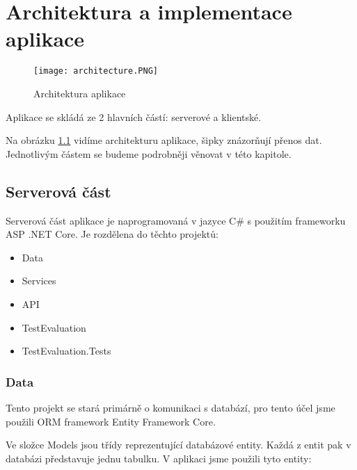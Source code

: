 \chapter{Architektura a implementace aplikace}

\begin{figure}
	\centering
	\texttt{[image: architecture.PNG]}
	\caption{Architektura aplikace}
	\label{fig:Architecture}
\end{figure}

Aplikace se skládá ze 2 hlavních částí: serverové a klientské.

Na obrázku \ref{fig:Architecture} vidíme architekturu aplikace, šipky znázorňují přenos dat. Jednotlivým částem se budeme podrobněji věnovat v této kapitole.

\section{Serverová část}

Serverová část aplikace je naprogramovaná v jazyce C\# s použitím 
frameworku ASP .NET Core. Je rozdělena do těchto projektů:

\begin{itemize}
	\item Data
	\item Services
	\item API
	\item TestEvaluation
	\item TestEvaluation.Tests
\end{itemize}

\subsection{Data}

Tento projekt se stará primárně o komunikaci s databází, pro tento účel jsme použili ORM framework Entity Framework Core. 

Ve složce Models jsou třídy reprezentující databázové entity. Každá z entit pak v databázi představuje jednu tabulku. V aplikaci jsme použili tyto entity:

